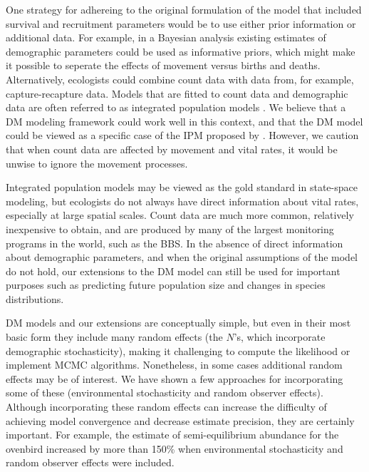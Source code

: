 \documentclass[12pt]{article}
\begin{document}
One strategy for adhereing to the original formulation of the
model that included survival and recruitment parameters would be to
use either prior information or additional data. For example, in a
Bayesian analysis existing estimates of demographic parameters
could be used as informative priors, which might make it possible to
seperate the effects of movement versus births and deaths.
Alternatively, ecologists could combine count data with data
from, for example,
capture-recapture data. Models that are fitted to count data and
demographic data are often referred to as integrated population models
\citep[IPM;][]{besbeas_etal:2002,
buckland_etal:2004,schaub_etal:2007}.
We believe that a DM modeling framework could work well in this context,
and that the DM model could be viewed as a specific case of the
IPM proposed by \citet{buckland_etal:2004}.
However, we caution that when count data are affected by
movement and vital rates, it would be unwise to ignore the movement
processes.


Integrated population models may be viewed as the gold standard in
state-space modeling, but ecologists do not always have direct
information about vital rates, especially at large spatial scales.
Count data are much more common, relatively inexpensive to obtain, and
are produced by many of the largest monitoring programs in the
world, such as the BBS. %
In the absence of direct information about demographic parameters, and
when the original assumptions of the model do not hold, our extensions to the
DM model can still be used for important purposes such as predicting future
population size and changes in species distributions.

DM models and our extensions are conceptually simple, but even in
their most basic form they include many random effects (the $N$'s, which
incorporate demographic stochasticity), making it challenging to compute the likelihood 
or implement MCMC algorithms. Nonetheless, in some cases additional random effects
may be of interest.  We have shown a few approaches for incorporating some of these
(environmental stochasticity and random observer effects).  %
Although incorporating these random effects can increase
the difficulty of achieving model convergence and decrease estimate precision, they are certainly important.
For example, the estimate of semi-equilibrium abundance for the ovenbird increased by more than 150\%
when environmental stochasticity and random observer effects were included.  
\end{document}
